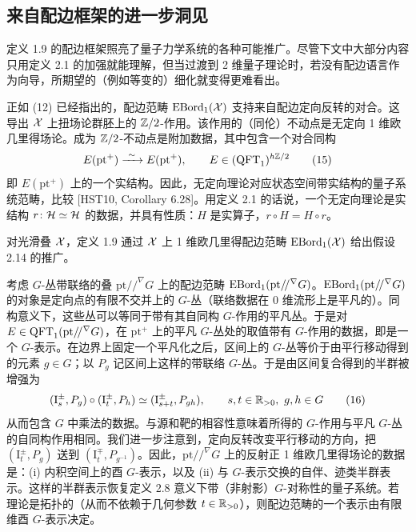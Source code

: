 \subsection{来自配边框架的进一步洞见}
定义 1.9 的配边框架照亮了量子力学系统的各种可能推广。尽管下文中大部分内容只用定义 2.1 的加强就能理解，但当过渡到 2 维量子理论时，若没有配边语言作为向导，所期望的（例如等变的）细化就变得更难看出。

\begin{example}
正如 (12) 已经指出的，配边范畴 $\operatorname{EBord}_1(\mathcal{X})$ 支持来自配边定向反转的对合。这导出 $\mathcal{X}$ 上扭场论群胚上的 $\mathbb{Z}/2$-作用。该作用的（同伦）不动点是无定向 1 维欧几里得场论。成为 $\mathbb{Z}/2$-不动点是附加数据，其中包含一个对合同构
\begin{equation}
E(\mathrm{pt}^{+})\xrightarrow{\ \sim\ }\ol{E(\mathrm{pt}^{+})},\qquad E\in(\QFT_1)^{h\Z/2}
\tag{15}
\end{equation}
即 $E(\mathrm{pt}^{+})$ 上的一个实结构。因此，无定向理论对应状态空间带实结构的量子系统范畴，比较 [HST10, Corollary 6.28]。用定义 2.1 的话说，一个无定向理论是实结构 $r\colon\mathcal{H}\simeq\mathcal{H}$ 的数据，并具有性质：$H$ 是实算子，$r\circ H=H\circ r$。
\end{example}

对光滑叠 $\mathcal{X}$，定义 1.9 通过 $\mathcal{X}$ 上 1 维欧几里得配边范畴 $\operatorname{EBord}_1(\mathcal{X})$ 给出假设 2.14 的推广。

\begin{example}[2.18（背景规范场与 $G$-表示）]
考虑 $G$-丛带联络的叠 $\mathrm{pt}/\!/^{\nabla}G$ 上的配边范畴 $\operatorname{EBord}_1(\mathrm{pt}/\!/^{\nabla}G)$。$\operatorname{EBord}_1(\mathrm{pt}/\!/^{\nabla}G)$ 的对象是定向点的有限不交并上的 $G$-丛（联络数据在 0 维流形上是平凡的）。同构意义下，这些丛可以等同于带有其自同构 $G$-作用的平凡丛。于是对 $E\in\operatorname{QFT}_1(\mathrm{pt}/\!/^{\nabla}G)$，在 $\mathrm{pt}^{+}$ 上的平凡 $G$-丛处的取值带有 $G$-作用的数据，即是一个 $G$-表示。在边界上固定一个平凡化之后，区间上的 $G$-丛等价于由平行移动得到的元素 $g\in G$；以 $P_g$ 记区间上这样的带联络 $G$-丛。于是由区间复合得到的半群被增强为
\begin{equation}
(\mathrm{I}^{\pm}_s,P_g)\circ(\mathrm{I}^{\pm}_t,P_h)\simeq(\mathrm{I}^{\pm}_{s+t},P_{gh}),\qquad s,t\in\mathbb{R}_{>0},\ g,h\in G
\tag{16}
\end{equation}
从而包含 $G$ 中乘法的数据。与源和靶的相容性意味着所得的 $G$-作用与平凡 $G$-丛的自同构作用相同。我们进一步注意到，定向反转改变平行移动的方向，把 $(\mathrm{I}^{\pm}_t,P_g)$ 送到 $(\mathrm{I}^{\mp}_t,P_{g^{-1}})$。因此，$\mathrm{pt}/\!/^{\nabla}G$ 上的反射正 1 维欧几里得场论的数据是：(i) 内积空间上的酉 $G$-表示，以及 (ii) 与 $G$-表示交换的自伴、迹类半群表示。这样的半群表示恢复定义 2.8 意义下带（非射影）$G$-对称性的量子系统。若理论是拓扑的（从而不依赖于几何参数 $t\in\mathbb{R}_{>0}$），则配边范畴的一个表示由有限维酉 $G$-表示决定。
\end{example}

